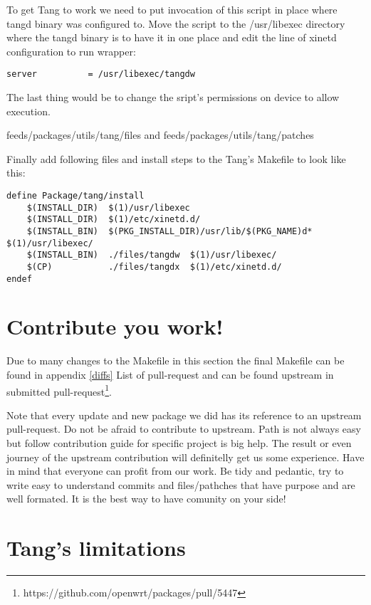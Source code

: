 To get Tang to work we need to put invocation of this script in place where tangd binary was configured to.
Move the script to the /usr/libexec directory where the tangd binary is to have it in one place and edit the line of xinetd configuration to run wrapper:
\begin{lstlisting}[columns=fixed,basicstyle=\ttfamily\footnotesize,tabsize=4,backgroundcolor=\color{yellow!10}]
    server          = /usr/libexec/tangdw
\end{lstlisting}
The last thing would be to change the sript's permissions on device to allow execution.

feeds/packages/utils/tang/files and feeds/packages/utils/tang/patches

Finally add following files and install steps to the Tang's Makefile to look like this:
\begin{lstlisting}[columns=fixed,basicstyle=\ttfamily\footnotesize,tabsize=4,backgroundcolor=\color{yellow!10}]
define Package/tang/install
	$(INSTALL_DIR)	$(1)/usr/libexec
	$(INSTALL_DIR)	$(1)/etc/xinetd.d/
	$(INSTALL_BIN)	$(PKG_INSTALL_DIR)/usr/lib/$(PKG_NAME)d*	$(1)/usr/libexec/
	$(INSTALL_BIN)	./files/tangdw	$(1)/usr/libexec/
	$(CP)			./files/tangdx	$(1)/etc/xinetd.d/
endef
\end{lstlisting}



\section{Contribute you work!}
Due to many changes to the Makefile in this section the final Makefile can be found in appendix \ref{diffs} List of pull-request and can be found upstream in submitted pull-request\footnote{https://github.com/openwrt/packages/pull/5447}.

Note that every update and new package we did has its reference to an upstream pull-request.
Do not be afraid to contribute to upstream.
Path is not always easy but follow contribution guide for specific project is big help.
The result or even journey of the upstream contribution will definitelly get us some experience.
Have in mind that everyone can profit from our work.
Be tidy and pedantic, try to write easy to understand commits and files/pathches that have purpose and are well formated.
It is the best way to have comunity on your side!




\section{Tang's limitations}\label{limitations}

